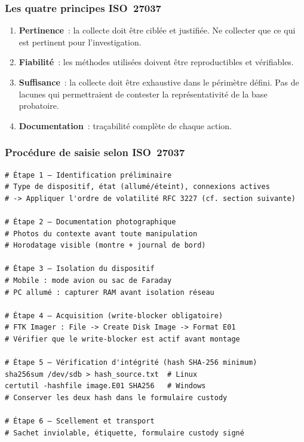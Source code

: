 \subsubsection*{Les quatre principes ISO~27037}

\begin{enumerate}
    \item \textbf{Pertinence}~: la collecte doit être ciblée et justifiée.
          Ne collecter que ce qui est pertinent pour l'investigation.
    \item \textbf{Fiabilité}~: les méthodes utilisées doivent être
          reproductibles et vérifiables.
    \item \textbf{Suffisance}~: la collecte doit être exhaustive dans
          le périmètre défini. Pas de lacunes qui permettraient de contester
          la représentativité de la base probatoire.
    \item \textbf{Documentation}~: traçabilité complète de chaque action.
\end{enumerate}

\subsubsection*{Procédure de saisie selon ISO~27037}

\begin{lstlisting}[language=bash_forensique,
    caption={Checklist de saisie ISO~27037 --- séquence minimale}]
# Étape 1 — Identification préliminaire
# Type de dispositif, état (allumé/éteint), connexions actives
# -> Appliquer l'ordre de volatilité RFC 3227 (cf. section suivante)

# Étape 2 — Documentation photographique
# Photos du contexte avant toute manipulation
# Horodatage visible (montre + journal de bord)

# Étape 3 — Isolation du dispositif
# Mobile : mode avion ou sac de Faraday
# PC allumé : capturer RAM avant isolation réseau

# Étape 4 — Acquisition (write-blocker obligatoire)
# FTK Imager : File -> Create Disk Image -> Format E01
# Vérifier que le write-blocker est actif avant montage

# Étape 5 — Vérification d'intégrité (hash SHA-256 minimum)
sha256sum /dev/sdb > hash_source.txt  # Linux
certutil -hashfile image.E01 SHA256   # Windows
# Conserver les deux hash dans le formulaire custody

# Étape 6 — Scellement et transport
# Sachet inviolable, étiquette, formulaire custody signé
\end{lstlisting}

